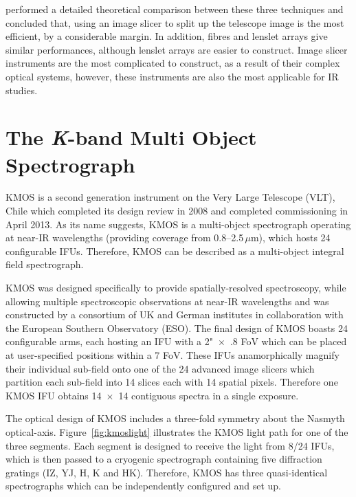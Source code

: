 \cite{2006NewAR..50..244A} performed a detailed theoretical comparison between these three techniques and concluded that, using an image slicer to split up the telescope image is the most efficient, by a considerable margin.
In addition, fibres and lenslet arrays give similar performances, although lenslet arrays are easier to construct.
Image slicer instruments are the most complicated to construct, as a result of their complex optical systems, however, these instruments are also the most applicable for IR studies.



\section{The {\it K}-band Multi Object Spectrograph} %
\label{sec:KMOS}
KMOS is a second generation instrument on the Very Large Telescope (VLT), Chile which completed its design review in 2008 and completed commissioning in April 2013.
As its name suggests, KMOS is a multi-object spectrograph operating at near-IR wavelengths (providing coverage from 0.8--2.5\,$\mu$m), which hosts 24 configurable IFUs.
Therefore, KMOS can be described as a multi-object integral field spectrograph.

KMOS was designed specifically to provide spatially-resolved spectroscopy, while allowing multiple spectroscopic observations at near-IR wavelengths and was constructed by a consortium of UK and German institutes in collaboration with the European Southern Observatory (ESO).
The final design of KMOS boasts 24 configurable arms, each hosting an IFU with a 2"~$\times$~\farcs.8 FoV which can be placed at user-specified positions within a 7 FoV.
These IFUs anamorphically magnify their individual sub-field onto one of the 24 advanced image slicers which partition each sub-field into 14 slices each with 14 spatial pixels.
Therefore one KMOS IFU obtains 14~$\times$~14 contiguous spectra in a single exposure.

The optical design of KMOS includes a three-fold symmetry about the Nasmyth optical-axis.
Figure~\ref{fig:kmoslight} illustrates the KMOS light path for one of the three segments.
Each segment is designed to receive the light from 8/24 IFUs, which is then passed to a cryogenic spectrograph containing five diffraction gratings
(IZ, YJ, H, K and HK).
Therefore, KMOS has three quasi-identical spectrographs which can be independently configured and set up.

